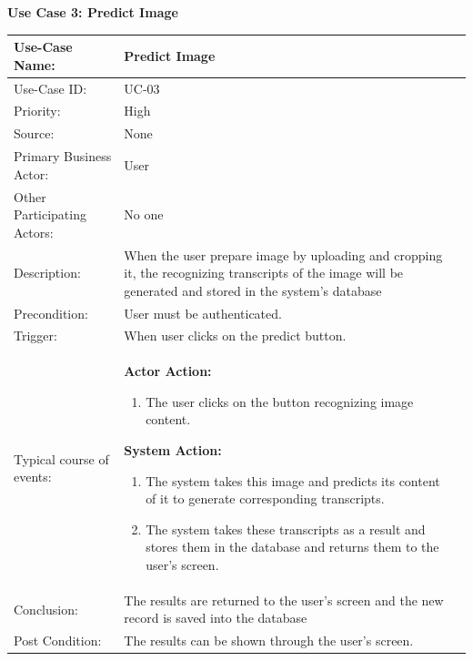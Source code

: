 \noindent
\textbf{Use Case 3: Predict Image}
\begin{table}[H]
    \centering
    \begin{tabular}{|l|p{}|p{}|}
    	\hline
    	Use-Case Name: & Predict Image\\ \hline
    	Use-Case ID:& UC-03 \\\hline
    	Priority:& High\\ \hline
    	Source:& None \\ \hline
    	Primary Business Actor: & User \\ \hline
    	Other Participating Actors:&  No one\\ \hline
    	Description:&  When the user prepare image by uploading and cropping it, the recognizing transcripts of the image will be generated and stored in the system's database  \\ \hline
    	Precondition:&  User must be authenticated. \\ \hline
    	Trigger:&  When user clicks on the predict button. \\ \hline 
    	Typical course of events:&  \textbf{Actor Action:}
    	\begin{enumerate}
    		\item 	The user clicks on the button recognizing image content.
    	\end{enumerate}
    
    	\vspace{2mm}
    	
    	\textbf{System Action: }
    	\begin{enumerate}
    		\item The system takes this image and predicts its content of it to generate corresponding transcripts.
    		\item The system takes these transcripts as a result and stores them in the database and returns them to the user's screen.
    	\end{enumerate}
    	\\ \hline
    	Conclusion:  & The results are returned to the user's screen and the new record is saved into the database \\ \hline
    	Post Condition: & The results can be shown through the user's screen. \\ \hline
    \end{tabular}\\
\end{table}

\clearpage

